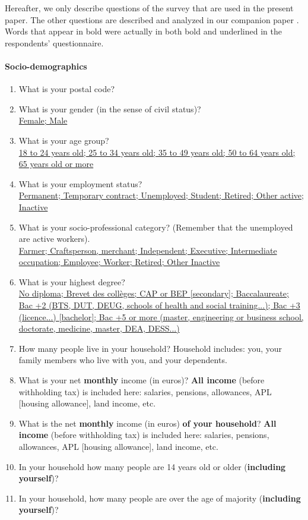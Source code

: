\documentclass[english,5p,authoryear]{elsarticle}
\begin{document}
\begin{appendices}
Hereafter, we only describe questions of the survey that are used
in the present paper. The other questions are described and analyzed
in our companion paper \citep{douenne_can_2019}. Words that appear in bold were actually in both bold and underlined in the respondents' questionnaire.

\paragraph{Socio-demographics}
\begin{enumerate}[resume,leftmargin=*]
\item What is your postal code? 
\item What is your gender (in the sense of civil status)? \uline{}\\
\uline{Female; Male }
\item What is your age group? \uline{}\\
\uline{18 to 24 years old; 25 to 34 years old; 35 to 49 years old;
50 to 64 years old; 65 years old or more} 
\item What is your employment status? \uline{}\\
\uline{Permanent; Temporary contract; Unemployed; Student; Retired;
Other active; Inactive}
\item What is your socio-professional category? (Remember that the unemployed
are active workers). \uline{}\\
\uline{Farmer; Craftsperson, merchant; Independent; Executive; Intermediate
occupation; Employee; Worker; Retired; Other Inactive} 
\item What is your highest degree? \uline{}\\
\uline{No diploma; Brevet des collèges; CAP or BEP {[}secondary{]};
Baccalaureate; Bac +2 (BTS, DUT, DEUG, schools of health and social
training...); Bac +3 (licence...) {[}bachelor{]}; Bac +5 or more (master,
engineering or business school, doctorate, medicine, master, DEA,
DESS...)}
\item How many people live in your household? Household includes: you, your
family members who live with you, and your dependents. 
\item What is your net \textbf{\textbf{monthly}} income (in euros)? \textbf{\textbf{All
income}} (before withholding tax) is included here: salaries, pensions,
allowances, APL {[}housing allowance{]}, land income, etc. 
\item What is the net \textbf{\textbf{monthly}} income (in euros) \textbf{\textbf{of
your household}}? \textbf{\textbf{All income}} (before withholding
tax) is included here: salaries, pensions, allowances, APL {[}housing
allowance{]}, land income, etc. 
\item In your household how many people are 14 years old or older (\textbf{\textbf{including
yourself}})? 
\item In your household, how many people are over the age of majority (\textbf{\textbf{including
yourself}})? 
\end{enumerate}


\end{appendices}
\end{document}
